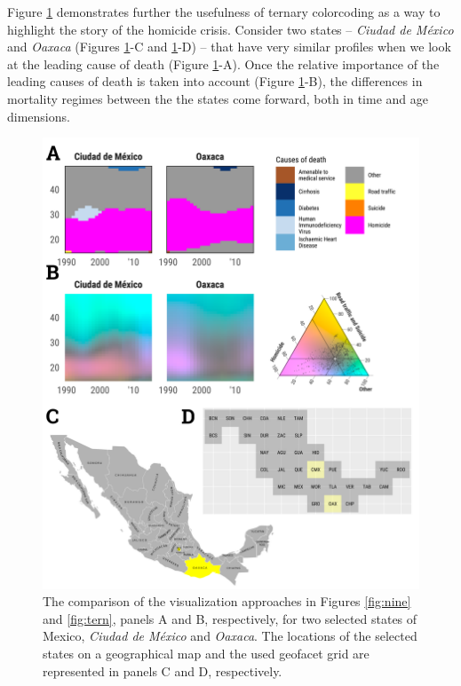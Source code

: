 \documentclass[10pt, twoside, parskip=half]{article}
\begin{document}
Figure \ref{fig:four} demonstrates further the usefulness of ternary colorcoding as a way to highlight the story of the homicide crisis. Consider two states -- \emph{Ciudad de México} and \emph{Oaxaca} (Figures \ref{fig:four}-C and \ref{fig:four}-D) -- that have very similar profiles when we look at the leading cause of death (Figure \ref{fig:four}-A). Once the relative importance of the leading causes of death is taken into account (Figure \ref{fig:four}-B), the differences in mortality regimes between the the states come forward, both in time and age dimensions.



\begin{figure}[!t]
\includegraphics[width=1\linewidth]{fig/gg-four} \caption{The comparison of the visualization approaches in Figures \ref{fig:nine} and \ref{fig:tern}, panels A and B, respectively, for two selected states of Mexico, \emph{Ciudad de México} and \emph{Oaxaca}. The locations of the selected states on a geographical map and the used geofacet grid are represented in panels C and D, respectively.}\label{fig:four}
\end{figure}
\end{document}
